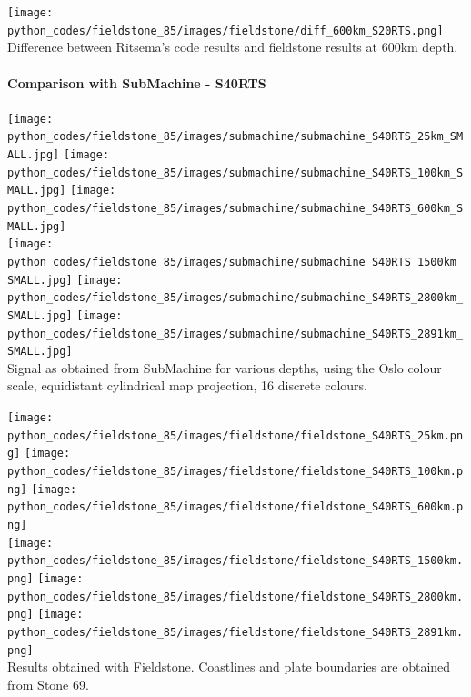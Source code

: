 \begin{center}
\texttt{[image: python\_codes/fieldstone\_85/images/fieldstone/diff\_600km\_S20RTS.png]}\\
{\captionfont Difference between Ritsema's code results and fieldstone results at 600\si{km} depth.}
\end{center}

\newpage
\paragraph{Comparison with SubMachine - S40RTS}

\begin{center}
\texttt{[image: python\_codes/fieldstone\_85/images/submachine/submachine\_S40RTS\_25km\_SMALL.jpg]}
\texttt{[image: python\_codes/fieldstone\_85/images/submachine/submachine\_S40RTS\_100km\_SMALL.jpg]}
\texttt{[image: python\_codes/fieldstone\_85/images/submachine/submachine\_S40RTS\_600km\_SMALL.jpg]}\\
\texttt{[image: python\_codes/fieldstone\_85/images/submachine/submachine\_S40RTS\_1500km\_SMALL.jpg]}
\texttt{[image: python\_codes/fieldstone\_85/images/submachine/submachine\_S40RTS\_2800km\_SMALL.jpg]}
\texttt{[image: python\_codes/fieldstone\_85/images/submachine/submachine\_S40RTS\_2891km\_SMALL.jpg]}\\
{\captionfont Signal as obtained from SubMachine for various depths, using the Oslo colour scale, 
equidistant cylindrical map projection, 16 discrete colours.}
\end{center}

\begin{center}
\texttt{[image: python\_codes/fieldstone\_85/images/fieldstone/fieldstone\_S40RTS\_25km.png]}
\texttt{[image: python\_codes/fieldstone\_85/images/fieldstone/fieldstone\_S40RTS\_100km.png]}
\texttt{[image: python\_codes/fieldstone\_85/images/fieldstone/fieldstone\_S40RTS\_600km.png]}\\
\texttt{[image: python\_codes/fieldstone\_85/images/fieldstone/fieldstone\_S40RTS\_1500km.png]}
\texttt{[image: python\_codes/fieldstone\_85/images/fieldstone/fieldstone\_S40RTS\_2800km.png]}
\texttt{[image: python\_codes/fieldstone\_85/images/fieldstone/fieldstone\_S40RTS\_2891km.png]}\\
{\captionfont Results obtained with Fieldstone. Coastlines and plate boundaries are obtained from Stone 69.}
\end{center}

